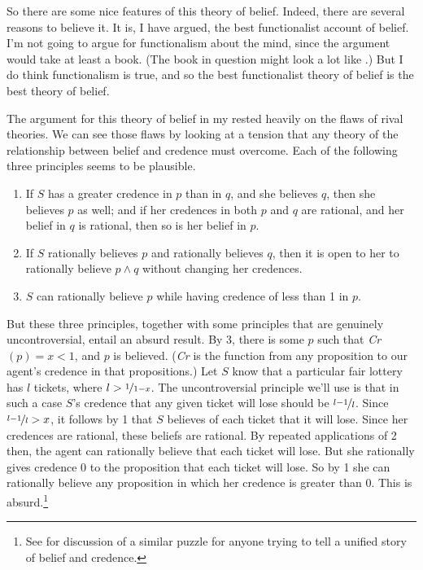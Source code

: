 So there are some nice features of this theory of belief. Indeed, there are several reasons to believe it. It is, I have argued, the best functionalist account of belief. I'm not going to argue for functionalism about the mind, since the argument would take at least a book. (The book in question might look a lot like \citet{DBMJackson2007}.) But I do think functionalism is true, and so the best functionalist theory of belief is the best theory of belief.

The argument for this theory of belief in my  \citeyearpar{Weatherson2005-WEACWD} rested heavily on the flaws of rival theories. We can see those flaws by looking at a tension that any theory of the relationship between belief and credence must overcome. Each of the following three principles seems to be plausible.

\begin{enumerate}
\item If $S$ has a greater credence in $p$ than in $q$, and she believes $q$, then she believes $p$ as well; and if her credences in both $p$ and $q$ are rational, and her belief in $q$ is rational, then so is her belief in $p$.
\item If $S$ rationally believes $p$ and rationally believes $q$, then it is open to her to rationally believe $p \wedge q$ without changing her credences.
\item $S$ can rationally believe $p$ while having credence of less than 1 in $p$.
\end{enumerate}

\noindent But these three principles, together with some principles that are genuinely uncontroversial, entail an absurd result. By 3, there is some $p$ such that \textit{Cr}$(p) = x < 1$, and $p$ is believed. (\textit{Cr} is the function from any proposition to our agent's credence in that propositions.) Let $S$ know that a particular fair lottery has $l$ tickets, where $l > \nicefrac{1}{1-x}$. The uncontroversial principle we'll use is that in such a case $S$'s credence that any given ticket will lose should be $\nicefrac{l-1}{l}$. Since $\nicefrac{l-1}{l} > x$, it follows by 1 that $S$ believes of each ticket that it will lose. Since her credences are rational, these beliefs are rational. By repeated applications of 2 then, the agent can rationally believe that each ticket will lose. But she rationally gives credence 0 to the proposition that each ticket will lose. So by 1 she can rationally believe any proposition in which her credence is greater than 0. This is absurd.\footnote{See \citet{Sturgeon2008-STURAT} for discussion of a similar puzzle for anyone trying to tell a unified story of belief and credence.}

